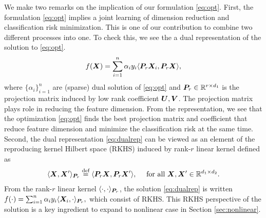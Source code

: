 \documentclass[12pt]{article}
\begin{document}
We make two remarks on the implication of our formulation \eqref{eq:opt}.
First, the formulation \eqref{eq:opt} implies a joint learning of dimension reduction and classification risk minimization. This is one of our contribution to combine two different processes into one. To check this, we see the a dual representation of the solution to \eqref{eq:opt}.
\begin{align}\label{eq:dualrep}
f(\bm X) = \sum_{i=1}^n \alpha_i y_i\langle \bm{P}_r\bm X_i, \bm{P}_r \bm X\rangle,
\end{align}
where $\{\alpha_i\}_{i=1}^n$ are  (sparse) dual solution of \eqref{eq:opt} and $\bm{P}_r\in\mathbb{R}^{r\times d_1}$ is the projection matrix induced by low rank coefficient $\bm{U},\bm{V}$. 
The projection matrix plays role in reducing the feature dimension.  From the representation, we see that the optimization \eqref{eq:opt} finds the best projection matrix and coefficient that reduce feature dimension and minimize the classification risk at the same time.
Second, the dual representation \eqref{eq:dualrep} can be viewed as an element of the reproducing kernel Hilbert space (RKHS) induced by rank-$r$ linear kernel defined as
\begin{align}\label{eq:linear kernel}
\langle \bm X,\bm X'\rangle_{\bm{P}_r} \stackrel{\text{def}}{=}\langle \bm{P}_r\bm X,\bm{P}_r\bm X'\rangle, \quad\text{ for all } \bm X,\bm X'\in\mathbb{R}^{d_1\times d_2}.
\end{align}
From the rank-$r$ linear kernel $\langle \cdot,\cdot\rangle_{\bm{P}_r}$, the solution \eqref{eq:dualrep} is written $f(\cdot) = \sum_{i=1}^n \alpha_iy_i\langle\bm X_i,\cdot\rangle_{\bm{P}_r},$ which consist of RKHS.  This RKHS perspective of the solution is a key ingredient to expand to nonlinear case in Section \ref{sec:nonlinear}.
\end{document}
